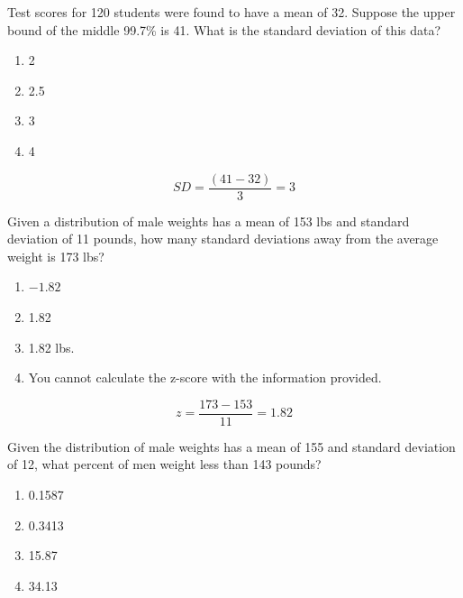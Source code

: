 \documentclass[11pt, chapterprefix=true]{scrbook}\usepackage[]{graphicx}\usepackage[]{color}
\begin{document}
\begin{exercises}
\begin{exercise}
    Test scores for 120 students were found to have a mean of 32.  Suppose the upper bound of the middle 99.7\% is  41.  What is the standard deviation of this data?
	  \begin{enumerate}
	  \item 2
	  \item 2.5
	  \item 3
	  \item 4
	  \end{enumerate}
	  \vspace{2mm}
	\end{exercise}
	\vspace{2mm}
	\begin{solution}
	  \begin{equation}
	    SD = \frac{(41 - 32)}{3} = 3
	  \end{equation}
	\end{solution}

  \begin{exercise} %

    Given a distribution of male weights  has a mean of 153 lbs and standard deviation of 11 pounds, how many standard deviations away from the average weight is 173 lbs?
	  \begin{enumerate}
	  \item $-1.82$
	  \item 1.82
	  \item 1.82 lbs.
	  \item You cannot calculate the z-score with the information provided.
	  \end{enumerate}
	  \vspace{2mm}
	\end{exercise}
	\vspace{2mm}
	\begin{solution}
	  \begin{equation}
	    z = \frac{173 - 153}{11} = 1.82
	  \end{equation}
	\end{solution}

  \begin{exercise} %

    Given the distribution of male weights has a mean of 155 and standard deviation of 12, what percent
of men weight less than 143 pounds?
	  \begin{enumerate}
	  \item 0.1587
	  \item 0.3413
	  \item 15.87
	  \item 34.13
	  \end{enumerate}
	  \vspace{2mm}
	\end{exercise}
	\vspace{2mm}
	\begin{solution}


\end{solution}
\end{exercises}
\end{document}
